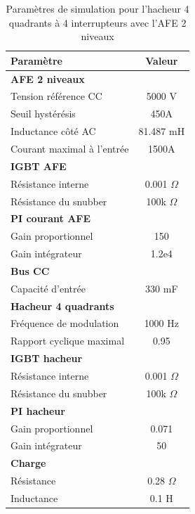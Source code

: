 \begin{table}[htb]
\centering
\begin{tabular}{|l|c|} 
  \hline
  \textbf{Paramètre} & \textbf{Valeur}  \\
  \hline\hline \hline
  \multicolumn{2}{|l|}{\textbf{AFE 2 niveaux}}\\ \hline \hline 
  Tension référence CC & 5000 V\\ \hline
  Seuil hystérésis & 450A\\ \hline
  Inductance côté AC& 81.487 mH\\ \hline
  Courant maximal à l'entrée& 1500A \\ \hline \hline
  \multicolumn{2}{|l|}{\textbf{IGBT AFE}}\\ \hline
  Résistance interne & 0.001 $\Omega$\\
  Résistance du snubber & 100k $\Omega$\\ \hline \hline
   \multicolumn{2}{|l|}{\textbf{PI courant AFE}}\\ \hline
  Gain proportionnel & 150 \\
  Gain intégrateur & 1.2e4 \\ \hline \hline
  \multicolumn{2}{|l|}{\textbf{Bus CC}}\\ \hline
  Capacité d'entrée & 330 mF\\
  \hline \hline \hline
  
  \multicolumn{2}{|l|}{\textbf{Hacheur 4 quadrants}}\\ \hline \hline
  Fréquence de modulation & 1000 Hz\\ \hline
  Rapport cyclique maximal & 0.95 \\ \hline \hline
  \multicolumn{2}{|l|}{\textbf{IGBT hacheur}}\\ \hline
  Résistance interne & 0.001 $\Omega$\\
  Résistance du snubber & 100k $\Omega$\\ \hline \hline
   \multicolumn{2}{|l|}{\textbf{PI hacheur}}\\ \hline
  Gain proportionnel & 0.071 \\
  Gain intégrateur & 50 \\ \hline \hline
  \multicolumn{2}{|l|}{\textbf{Charge}}\\ \hline
  Résistance & 0.28 $\Omega$\\
  Inductance & 0.1 H\\
  \hline
\end{tabular}
\caption{Paramètres de simulation pour l'hacheur 4 quadrants à 4 interrupteurs avec l'AFE 2 niveaux}
\label{p_AF_hash}
\end{table}
\clearpage


